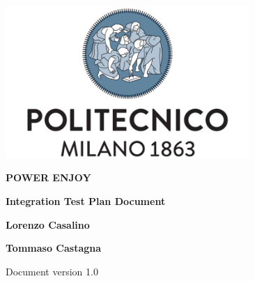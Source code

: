 \begin{titlepage}
        \begin{center}
                \includegraphics[width=350px]{../Datas/images/polimi.png}

                \vspace*{2.0cm}

                {\Huge \textbf{POWER ENJOY}\par}

                \vspace*{1.0cm}

                {\LARGE \textbf{Integration Test Plan Document}\par}

                \vspace*{2.0cm}

                {\normalsize
                \textbf{Lorenzo Casalino}\par
                \textbf{Tommaso Castagna}\par
                }

                \vfill
                Document version 1.0
        \end{center}
\end{titlepage}

